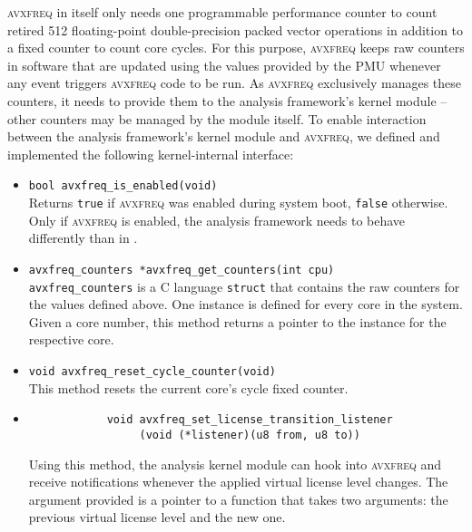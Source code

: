 \textsc{avxfreq} in itself only needs one programmable performance counter to count retired \SI[number-unit-product=-]{512}{\bit} floating-point double-precision packed vector operations in addition to a fixed counter to count core cycles. For this purpose, \textsc{avxfreq} keeps raw counters in software that are updated using the values provided by the \gls{PMU} whenever any event triggers \textsc{avxfreq} code to be run. As \textsc{avxfreq} exclusively manages these counters, it needs to provide them to the analysis framework's kernel module -- other counters may be managed by the module itself. To enable interaction between the analysis framework's kernel module and \textsc{avxfreq}, we defined and implemented the following kernel-internal interface:

\begin{itemize}
	\item \texttt{bool avxfreq_is_enabled(void)} \\
		Returns \texttt{true} if \textsc{avxfreq} was enabled during system boot, \texttt{false} otherwise. Only if \textsc{avxfreq} is enabled, the analysis framework needs to behave differently than in .
	\item \texttt{avxfreq_counters *avxfreq_get_counters(int cpu)} \\
		\texttt{avxfreq_counters} is a C language \texttt{struct} that contains the raw counters for the values defined above. One instance is defined for every core in the system. Given a core number, this method returns a pointer to the instance for the respective core.
	\item \texttt{void avxfreq_reset_cycle_counter(void)} \\
		This method resets the current core's cycle fixed counter. %
	\item \begin{verbatim}
			void avxfreq_set_license_transition_listener
			     (void (*listener)(u8 from, u8 to))
		\end{verbatim}
		\vspace{-0.45cm} %
		Using this method, the analysis kernel module can hook into \textsc{avxfreq} and receive notifications whenever the applied virtual license level changes. The argument provided is a pointer to a function that takes two arguments: the previous virtual license level and the new one.
\end{itemize}

